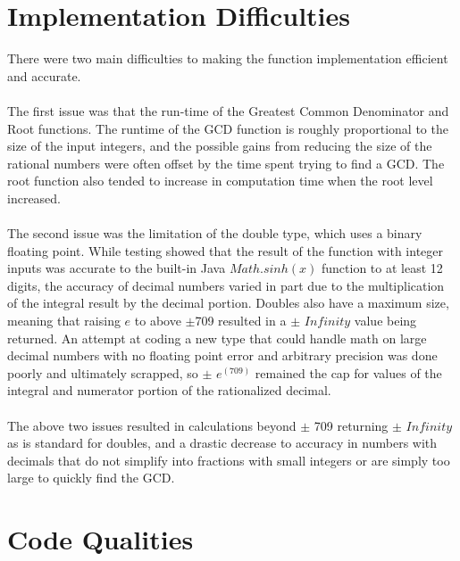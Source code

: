 \documentclass[letterpaper, 11pt]{report}
\begin{document}
\section*{Implementation Difficulties}
\normalsize{There were two main difficulties to making the function implementation efficient and accurate. \\\\
The first issue was that the run-time of the Greatest Common Denominator and Root functions. The runtime of the GCD function is roughly proportional to the size of the input integers, and the possible gains from reducing the size of the rational numbers were often offset by the time spent trying to find a GCD. The root function also tended to increase in computation time when the root level increased. \\\\
The second issue was the limitation of the double type, which uses a binary floating point. While testing showed that the result of the function with integer inputs was accurate to the built-in Java $Math.sinh(x)$ function to at least 12 digits, the accuracy of decimal numbers varied in part due to the multiplication of the integral result by the decimal portion. Doubles also have a maximum size, meaning that raising $e$ to above $\pm$709 resulted in a $\pm$ $Infinity$ value being returned. An attempt at coding a new type that could handle math on large decimal numbers with no floating point error and arbitrary precision was done poorly and ultimately scrapped, so $\pm$ $e^(709)$ remained the cap for values of the integral and numerator portion of the rationalized decimal. \\\\
The above two issues resulted in calculations beyond $\pm$ 709 returning $\pm$ $Infinity$ as is standard for doubles, and a drastic decrease to accuracy in numbers with decimals that do not simplify into fractions with small integers or are simply too large to quickly find the GCD.}

\section*{Code Qualities}
\end{document}
